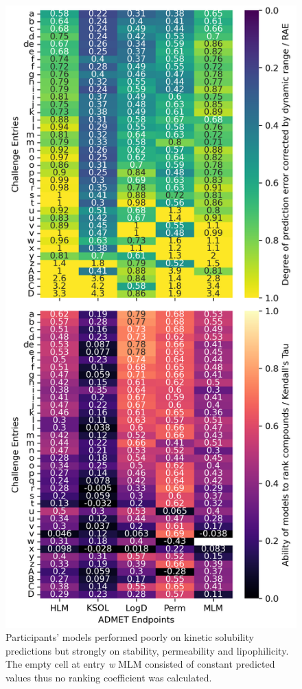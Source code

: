 \documentclass[journal=jcim,manuscript=article]{achemso}
\begin{document}
\begin{figure}
    \includegraphics[scale=0.6]{04_figs_leaderboards/heatmaps.png}
  \caption{Participants' models performed poorly on kinetic solubility predictions but strongly on stability, permeability and lipophilicity. The empty cell at entry \textit{w} MLM consisted of constant predicted values thus no ranking coefficient was calculated.}
  \label{fgr:heatmaps_admet}
\end{figure}
\end{document}
